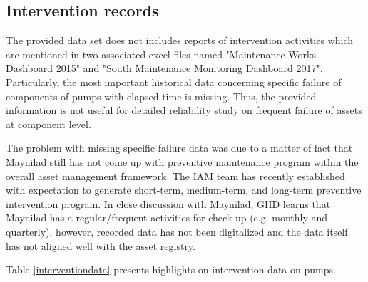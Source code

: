\subsection{Intervention records}
\label{212}
The provided data set does not includes reports of intervention activities which are mentioned in two associated excel files named "Maintenance Works Dashboard 2015" and "South Maintenance Monitoring Dashboard 2017". Particularly, the most important historical data concerning specific failure of components of pumps with elapsed time is missing. Thus, the provided information is not useful for detailed reliability study on frequent failure of assets at component level. 

The problem with missing specific failure data was due to a matter of fact that Maynilad still has not come up with preventive maintenance program within the overall asset management framework. The IAM team has recently established with expectation to generate short-term, medium-term, and long-term preventive intervention program. In close discussion with Maynilad, GHD learns that Maynilad has a regular/frequent activities for check-up (e.g. monthly and quarterly), however, recorded data has not been digitalized and the data itself has not aligned well with the asset registry. 

Table \ref{interventiondata} presents highlights on intervention data on pumps.


